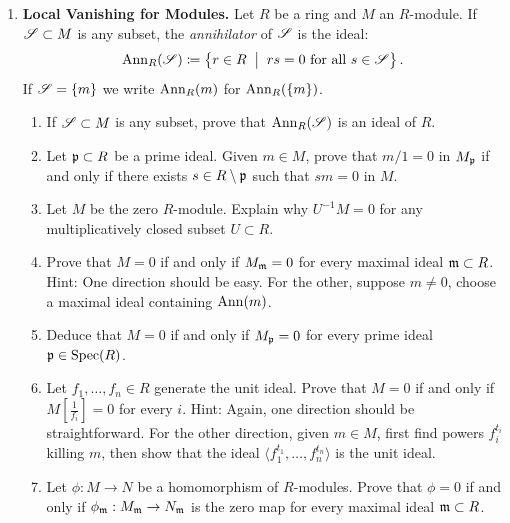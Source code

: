 \documentclass[12pt,reqno]{amsart}
\begin{document}
\begin{enumerate}[leftmargin=*, series=problems]

\item \textbf{Local Vanishing for Modules.} Let $R$ be a ring and $M$ an $R$-module. If $\mathcal{S} \subset M$ is any subset, the \emph{annihilator} of $\mathcal{S}$ is the ideal:
\[
\operatorname{Ann}_{R}(\mathcal{S}) \coloneqq \left\{ r \in R \;\; \big|\;\; rs = 0 \text{ for all $s\in \mathcal{S}$}\right\}.
\] 
If $\mathcal{S}=\{m\}$ we write $\operatorname{Ann}_{R}(m)$ for $\operatorname{Ann}_{R}(\{m\})$. 
\begin{enumerate}
    \item If $\mathcal{S} \subset M$ is any subset, prove that $\operatorname{Ann}_{R}(\mathcal{S})$ is an ideal of $R$. 
    \item Let $\mathfrak{p} \subset R$ be a prime ideal. Given $m \in M$, prove that $m/1=0$ in $M_{\mathfrak{p}}$ if and only if there exists $s\in R\setminus \mathfrak{p}$ such that $sm=0$ in $M$.
    \item Let $M$ be the zero $R$-module. Explain why $U^{-1}M=0$ for any multiplicatively closed subset $U \subset R$. 
    \item Prove that $M=0$ if and only if $M_{\mathfrak{m}}=0$ for every maximal ideal $\mathfrak{m}\subset R$. Hint: One direction should be easy. For the other, suppose $m\neq 0$, choose a maximal ideal containing $\operatorname{Ann}(m)$.
    \item Deduce that $M=0$ if and only if $M_{\mathfrak{p}}=0$ for every prime ideal $\mathfrak{p}\in \operatorname{Spec}(R)$.
    \item Let $f_1,\ldots,f_n\in R$ generate the unit ideal. Prove that $M=0$ if and only if $M[\frac{1}{f_{i}}]=0$ for every $i$. Hint: Again, one direction should be straightforward. For the other direction, given $m\in M$, first find powers $f_i^{t_i}$ killing $m$, then show that the ideal $\langle f_1^{t_1},\ldots,f_n^{t_n}\rangle$ is the unit ideal.
    \item Let $\phi:M\to N$ be a homomorphism of $R$-modules. Prove that $\phi=0$ if and only if $\phi_{\mathfrak{m}}:M_{\mathfrak{m}}\to N_{\mathfrak{m}}$ is the zero map for every maximal ideal $\mathfrak{m}\subset R$.
\end{enumerate}


\end{enumerate}
\end{document}
